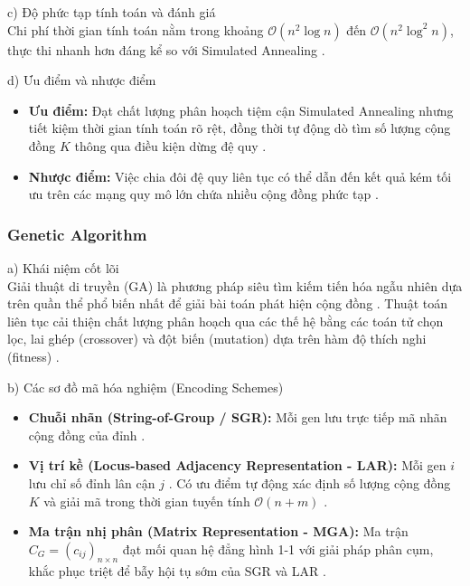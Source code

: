 \documentclass[14pt,a4paper]{extarticle}
\begin{document}
\noindent c) Độ phức tạp tính toán và đánh giá
\\ 
Chi phí thời gian tính toán nằm trong khoảng $\mathcal{O}(n^2 \log n)$ đến $\mathcal{O}(n^2 \log^2 n)$, thực thi nhanh hơn đáng kể so với Simulated Annealing \cite{Fortunato2010, Bedi2016}.

\noindent d) Ưu điểm và nhược điểm
\begin{itemize}
    \item \textbf{Ưu điểm:} Đạt chất lượng phân hoạch tiệm cận Simulated Annealing nhưng tiết kiệm thời gian tính toán rõ rệt, đồng thời tự động dò tìm số lượng cộng đồng $K$ thông qua điều kiện dừng đệ quy \cite{Beldi2025}.
    \item \textbf{Nhược điểm:} Việc chia đôi đệ quy liên tục có thể dẫn đến kết quả kém tối ưu trên các mạng quy mô lớn chứa nhiều cộng đồng phức tạp \cite{Fortunato2010}.
\end{itemize}

\subsubsection{Genetic Algorithm}

\noindent a) Khái niệm cốt lõi
\\
Giải thuật di truyền (GA) là phương pháp siêu tìm kiếm tiến hóa ngẫu nhiên dựa trên quần thể phổ biến nhất để giải bài toán phát hiện cộng đồng \cite{Chen2019, Beldi2025}. Thuật toán liên tục cải thiện chất lượng phân hoạch qua các thế hệ bằng các toán tử chọn lọc, lai ghép (crossover) và đột biến (mutation) dựa trên hàm độ thích nghi (fitness) \cite{Chen2019}.

\noindent b) Các sơ đồ mã hóa nghiệm (Encoding Schemes)
\begin{itemize}
    \item \textbf{Chuỗi nhãn (String-of-Group / SGR):} Mỗi gen lưu trực tiếp mã nhãn cộng đồng của đỉnh \cite{Chen2019}.
    \item \textbf{Vị trí kề (Locus-based Adjacency Representation - LAR):} Mỗi gen $i$ lưu chỉ số đỉnh lân cận $j$ \cite{Pizzuti2008, Chen2019}. Có ưu điểm tự động xác định số lượng cộng đồng $K$ và giải mã trong thời gian tuyến tính $\mathcal{O}(n + m)$ \cite{Said2018, Baraa2021}.
    \item \textbf{Ma trận nhị phân (Matrix Representation - MGA):} Ma trận $C_G = (c_{ij})_{n \times n}$ đạt mối quan hệ đẳng hình 1-1 với giải pháp phân cụm, khắc phục triệt để bẫy hội tụ sớm của SGR và LAR \cite{Chen2019}.
\end{itemize}
\end{document}
